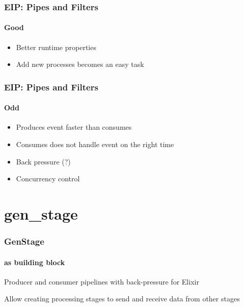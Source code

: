 \documentclass{beamer}
\begin{document}
  
  \begin{frame}
    \frametitle{EIP: Pipes and Filters}
    \framesubtitle{Good}

    \begin{itemize}[<+->]
      \item Better runtime properties
      \item Add new processes becomes an easy task
    \end{itemize}
    
  \end{frame}


  \begin{frame}
    \frametitle{EIP: Pipes and Filters}
    \framesubtitle{Odd}
    
    \begin{itemize}[<+->]
      \item  Produces event faster than consumes
      \item  Consumes does not handle event on the right time
      \item  Back pressure (?)
      \item  Concurrency control
    \end{itemize}
  
  \end{frame}
  
  \section[Section]{gen_stage}
  
  \begin{frame}
    \frametitle{GenStage}
    \framesubtitle{as building block}
        
    \begin{block}{}
    Producer and consumer pipelines with back-pressure for Elixir \pause
    \end{block}
    
    \begin{alertblock}{}
    Allow creating processing stages to send and receive data from other stages
    \end{alertblock}
            
  \end{frame}
  
\end{document}
